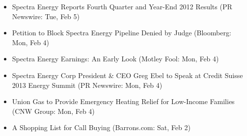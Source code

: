 \documentclass[11pt,asymmetric]{article}
\begin{document}
\begin{itemize}
\item Spectra Energy Reports Fourth Quarter and Year-End 2012 Results (PR Newswire: Tue, Feb 5)
\item Petition to Block Spectra Energy Pipeline Denied by Judge (Bloomberg: Mon, Feb 4)
\item Spectra Energy Earnings: An Early Look (Motley Fool: Mon, Feb 4)
\item Spectra Energy Corp President \& CEO Greg Ebel to Speak at Credit Suisse 2013 Energy Summit (PR Newswire: Mon, Feb 4)
\item Union Gas to Provide Emergency Heating Relief for Low-Income Families (CNW Group: Mon, Feb 4)
\item A Shopping List for Call Buying (Barrons.com: Sat, Feb 2)
\end{itemize}
\end{document}
